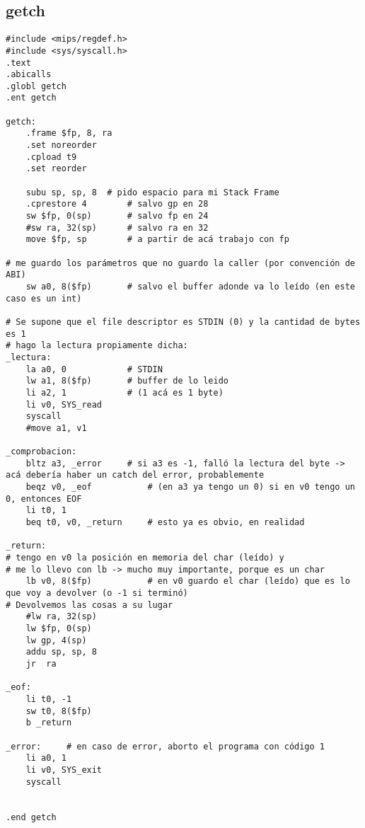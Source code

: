\documentclass[a4paper,11pt]{article}
\begin{document}
\subsection{getch}
\begin{verbatim}
#include <mips/regdef.h>
#include <sys/syscall.h>
.text
.abicalls
.globl getch
.ent getch

getch:
	.frame $fp, 8, ra
	.set noreorder
	.cpload t9
	.set reorder

	subu sp, sp, 8 	# pido espacio para mi Stack Frame
	.cprestore 4		# salvo gp en 28
	sw $fp, 0(sp)		# salvo fp en 24
	#sw ra, 32(sp)		# salvo ra en 32
	move $fp, sp		# a partir de acá trabajo con fp

# me guardo los parámetros que no guardo la caller (por convención de ABI)
	sw a0, 8($fp)		# salvo el buffer adonde va lo leído (en este caso es un int)

# Se supone que el file descriptor es STDIN (0) y la cantidad de bytes es 1
# hago la lectura propiamente dicha:
_lectura:
	la a0, 0			# STDIN
	lw a1, 8($fp) 		# buffer de lo leido
	li a2, 1			# (1 acá es 1 byte)
	li v0, SYS_read
	syscall
	#move a1, v1

_comprobacion:
	bltz a3, _error		# si a3 es -1, falló la lectura del byte -> acá debería haber un catch del error, probablemente
	beqz v0, _eof			# (en a3 ya tengo un 0) si en v0 tengo un 0, entonces EOF
	li t0, 1
	beq t0, v0, _return		# esto ya es obvio, en realidad

_return:
# tengo en v0 la posición en memoria del char (leído) y
# me lo llevo con lb -> mucho muy importante, porque es un char
	lb v0, 8($fp)			# en v0 guardo el char (leído) que es lo que voy a devolver (o -1 si terminó)
# Devolvemos las cosas a su lugar
	#lw ra, 32(sp)
	lw $fp, 0(sp)
	lw gp, 4(sp)
	addu sp, sp, 8
	jr	ra

_eof:
	li t0, -1
	sw t0, 8($fp)
	b _return

_error:		# en caso de error, aborto el programa con código 1
	li a0, 1
	li v0, SYS_exit
	syscall


.end getch
\end{verbatim}
\end{document}
